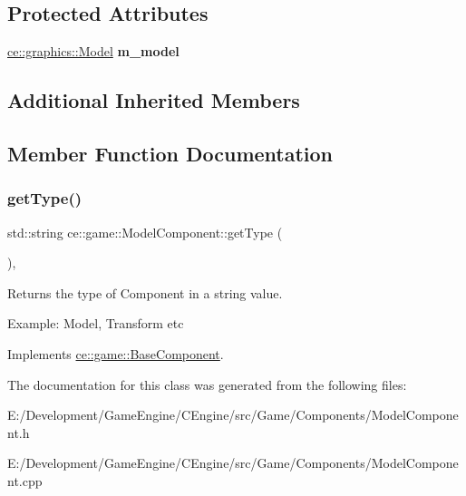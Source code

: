 \subsection*{Protected Attributes}
\begin{DoxyCompactItemize}
\item 
\mbox{\label{classce_1_1game_1_1_model_component_a275f61abbf878c431026539adf141775}} 
\hyperlink{classce_1_1graphics_1_1_model}{ce\+::graphics\+::\+Model} {\bfseries m\+\_\+model}
\end{DoxyCompactItemize}
\subsection*{Additional Inherited Members}


\subsection{Member Function Documentation}
\mbox{\label{classce_1_1game_1_1_model_component_aaac15cad336e35df7be55dda34f53643}} 
\subsubsection{\texorpdfstring{get\+Type()}{getType()}}
{\footnotesize\ttfamily std\+::string ce\+::game\+::\+Model\+Component\+::get\+Type (\begin{DoxyParamCaption}{ }\end{DoxyParamCaption})\hspace{0.3cm}{\ttfamily [override]}, {\ttfamily [virtual]}}



Returns the type of Component in a string value. 

Example\+: Model, Transform etc 

Implements \hyperlink{classce_1_1game_1_1_base_component_a1022b55c1926a019a2b3a71fb6b9150e}{ce\+::game\+::\+Base\+Component}.



The documentation for this class was generated from the following files\+:\begin{DoxyCompactItemize}
\item 
E\+:/\+Development/\+Game\+Engine/\+C\+Engine/src/\+Game/\+Components/Model\+Component.\+h\item 
E\+:/\+Development/\+Game\+Engine/\+C\+Engine/src/\+Game/\+Components/Model\+Component.\+cpp\end{DoxyCompactItemize}

